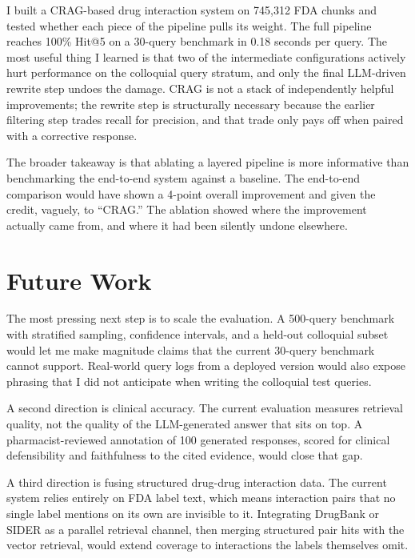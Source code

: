 \documentclass[12pt]{article}
\begin{document}
I built a CRAG-based drug interaction system on 745{,}312 FDA chunks and tested whether each piece of the pipeline pulls its weight. The full pipeline reaches 100\% Hit@5 on a 30-query benchmark in 0.18 seconds per query. The most useful thing I learned is that two of the intermediate configurations actively hurt performance on the colloquial query stratum, and only the final LLM-driven rewrite step undoes the damage. CRAG is not a stack of independently helpful improvements; the rewrite step is structurally necessary because the earlier filtering step trades recall for precision, and that trade only pays off when paired with a corrective response.

The broader takeaway is that ablating a layered pipeline is more informative than benchmarking the end-to-end system against a baseline. The end-to-end comparison would have shown a 4-point overall improvement and given the credit, vaguely, to ``CRAG.'' The ablation showed where the improvement actually came from, and where it had been silently undone elsewhere.

\section{Future Work}

The most pressing next step is to scale the evaluation. A 500-query benchmark with stratified sampling, confidence intervals, and a held-out colloquial subset would let me make magnitude claims that the current 30-query benchmark cannot support. Real-world query logs from a deployed version would also expose phrasing that I did not anticipate when writing the colloquial test queries.

A second direction is clinical accuracy. The current evaluation measures retrieval quality, not the quality of the LLM-generated answer that sits on top. A pharmacist-reviewed annotation of 100 generated responses, scored for clinical defensibility and faithfulness to the cited evidence, would close that gap.

A third direction is fusing structured drug-drug interaction data. The current system relies entirely on FDA label text, which means interaction pairs that no single label mentions on its own are invisible to it. Integrating DrugBank or SIDER as a parallel retrieval channel, then merging structured pair hits with the vector retrieval, would extend coverage to interactions the labels themselves omit.
\end{document}
